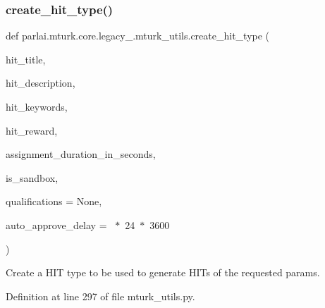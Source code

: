 \subsubsection{\texorpdfstring{create\+\_\+hit\+\_\+type()}{create\_hit\_type()}}
{\footnotesize\ttfamily def parlai.\+mturk.\+core.\+legacy\+\_.\+mturk\+\_\+utils.\+create\+\_\+hit\+\_\+type (\begin{DoxyParamCaption}\item[{}]{hit\+\_\+title,  }\item[{}]{hit\+\_\+description,  }\item[{}]{hit\+\_\+keywords,  }\item[{}]{hit\+\_\+reward,  }\item[{}]{assignment\+\_\+duration\+\_\+in\+\_\+seconds,  }\item[{}]{is\+\_\+sandbox,  }\item[{}]{qualifications = {\ttfamily None},  }\item[{}]{auto\+\_\+approve\+\_\+delay = {~$\ast$~24~$\ast$~3600} }\end{DoxyParamCaption})}

\begin{DoxyVerb}Create a HIT type to be used to generate HITs of the requested params.
\end{DoxyVerb}
 

Definition at line 297 of file mturk\+\_\+utils.\+py.


